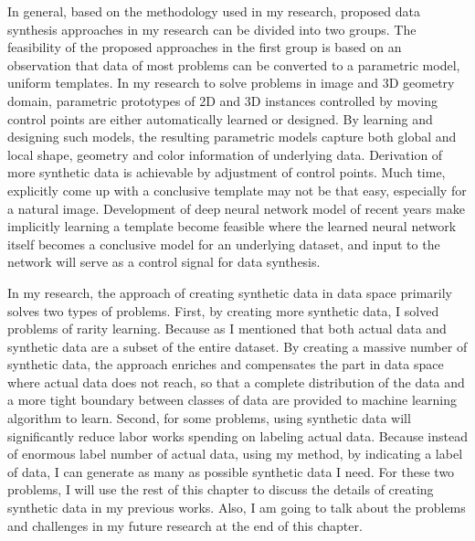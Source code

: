 \documentclass{iitthesis}
\begin{document}
In general, based on the methodology used in my research, proposed data synthesis approaches in my research can be divided into two groups. The feasibility of the proposed approaches in the first group is based on an observation that data of most problems can be converted to a parametric model, uniform templates.  In my research to solve problems in image and 3D geometry domain, parametric prototypes of 2D and 3D instances controlled by moving control points are either automatically learned or designed. By learning and designing such models, the resulting parametric models capture both global and local shape, geometry and color information of underlying data. Derivation of more synthetic data is achievable by adjustment of control points. Much time, explicitly come up with a conclusive template may not be that easy, especially for a natural image. Development of deep neural network model of recent years make implicitly learning a template become feasible where the learned neural network itself becomes a conclusive model for an underlying dataset, and input to the network will serve as a control signal for data synthesis.

In my research, the approach of creating synthetic data in data space primarily solves two types of problems. First, by creating more synthetic data, I solved problems of rarity learning. Because as I mentioned that both actual data and synthetic data are a subset of the entire dataset. By creating a massive number of synthetic data, the approach enriches and compensates the part in data space where actual data does not reach, so that a complete distribution of the data and a more tight boundary between classes of data are provided to machine learning algorithm to learn. Second, for some problems, using synthetic data will significantly reduce labor works spending on labeling actual data. Because instead of enormous label number of actual data, using my method, by indicating a label of data, I can generate as many as possible synthetic data I need. For these two problems, I will use the rest of this chapter to discuss the details of creating synthetic data in my previous works. Also, I am going to talk about the problems and challenges in my future research at the end of this chapter.
\end{document}
